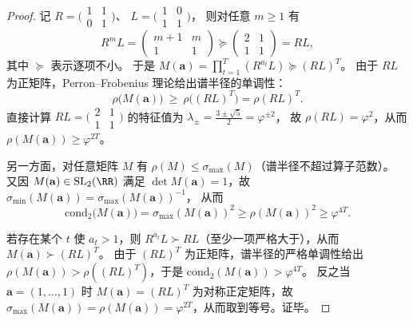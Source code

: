 \begin{proof}
记
\(
R=\bigl(\begin{smallmatrix}1&1\\0&1\end{smallmatrix}\bigr)
\)、
\(
L=\bigl(\begin{smallmatrix}1&0\\1&1\end{smallmatrix}\bigr)
\)，
则对任意 \(m\ge 1\) 有
\[
R^mL=
\begin{pmatrix}
m+1&m\\
1&1
\end{pmatrix}
\succeq
\begin{pmatrix}
2&1\\
1&1
\end{pmatrix}
=RL,
\]
其中 \(\succeq\) 表示逐项不小。
于是
\(
M(\mathbf a)=\prod_{t=1}^T(R^{a_t}L)\succeq (RL)^T
\)。
由于 \(RL\) 为正矩阵，Perron--Frobenius 理论给出谱半径的单调性：
\[
\rho\!\bigl(M(\mathbf a)\bigr)\ \ge\ \rho\!\bigl((RL)^T\bigr)=\rho(RL)^T.
\]
直接计算
\(
RL=\bigl(\begin{smallmatrix}2&1\\1&1\end{smallmatrix}\bigr)
\)
的特征值为
\(
\lambda_\pm=\frac{3\pm\sqrt5}{2}=\varphi^{\pm 2}
\)，
故 \(\rho(RL)=\varphi^2\)，从而 \(\rho(M(\mathbf a))\ge \varphi^{2T}\)。

\par
另一方面，对任意矩阵 \(M\) 有 \(\rho(M)\le \sigma_{\max}(M)\)（谱半径不超过算子范数）。
又因 \(M(\mathbf a)\in \mathrm{SL}_2(\RR)\) 满足 \(\det M(\mathbf a)=1\)，故
\(
\sigma_{\min}(M(\mathbf a))=\sigma_{\max}(M(\mathbf a))^{-1}
\)，
从而
\[
\mathrm{cond}_2\!\bigl(M(\mathbf a)\bigr)
=\sigma_{\max}(M(\mathbf a))^2
\ge \rho(M(\mathbf a))^2
\ge \varphi^{4T}.
\]

\par
若存在某个 \(t\) 使 \(a_t>1\)，则 \(R^{a_t}L\succ RL\)（至少一项严格大于），从而 \(M(\mathbf a)\succ (RL)^T\)。
由于 \((RL)^T\) 为正矩阵，谱半径的严格单调性给出 \(\rho(M(\mathbf a))>\rho((RL)^T)\)，于是 \(\mathrm{cond}_2(M(\mathbf a))>\varphi^{4T}\)。
反之当 \(\mathbf a=(1,\dots,1)\) 时 \(M(\mathbf a)=(RL)^T\) 为对称正定矩阵，故 \(\sigma_{\max}(M(\mathbf a))=\rho(M(\mathbf a))=\varphi^{2T}\)，从而取到等号。证毕。
\end{proof}

